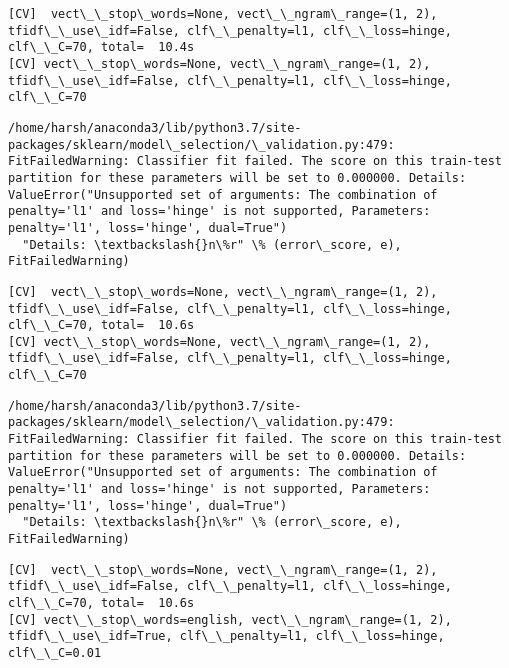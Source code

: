 \documentclass[11pt]{article}
\begin{document}
    \begin{Verbatim}[commandchars=\\\{\}]
[CV]  vect\_\_stop\_words=None, vect\_\_ngram\_range=(1, 2), tfidf\_\_use\_idf=False, clf\_\_penalty=l1, clf\_\_loss=hinge, clf\_\_C=70, total=  10.4s
[CV] vect\_\_stop\_words=None, vect\_\_ngram\_range=(1, 2), tfidf\_\_use\_idf=False, clf\_\_penalty=l1, clf\_\_loss=hinge, clf\_\_C=70 

    \end{Verbatim}

    \begin{Verbatim}[commandchars=\\\{\}]
/home/harsh/anaconda3/lib/python3.7/site-packages/sklearn/model\_selection/\_validation.py:479: FitFailedWarning: Classifier fit failed. The score on this train-test partition for these parameters will be set to 0.000000. Details: 
ValueError("Unsupported set of arguments: The combination of penalty='l1' and loss='hinge' is not supported, Parameters: penalty='l1', loss='hinge', dual=True")
  "Details: \textbackslash{}n\%r" \% (error\_score, e), FitFailedWarning)

    \end{Verbatim}

    \begin{Verbatim}[commandchars=\\\{\}]
[CV]  vect\_\_stop\_words=None, vect\_\_ngram\_range=(1, 2), tfidf\_\_use\_idf=False, clf\_\_penalty=l1, clf\_\_loss=hinge, clf\_\_C=70, total=  10.6s
[CV] vect\_\_stop\_words=None, vect\_\_ngram\_range=(1, 2), tfidf\_\_use\_idf=False, clf\_\_penalty=l1, clf\_\_loss=hinge, clf\_\_C=70 

    \end{Verbatim}

    \begin{Verbatim}[commandchars=\\\{\}]
/home/harsh/anaconda3/lib/python3.7/site-packages/sklearn/model\_selection/\_validation.py:479: FitFailedWarning: Classifier fit failed. The score on this train-test partition for these parameters will be set to 0.000000. Details: 
ValueError("Unsupported set of arguments: The combination of penalty='l1' and loss='hinge' is not supported, Parameters: penalty='l1', loss='hinge', dual=True")
  "Details: \textbackslash{}n\%r" \% (error\_score, e), FitFailedWarning)

    \end{Verbatim}

    \begin{Verbatim}[commandchars=\\\{\}]
[CV]  vect\_\_stop\_words=None, vect\_\_ngram\_range=(1, 2), tfidf\_\_use\_idf=False, clf\_\_penalty=l1, clf\_\_loss=hinge, clf\_\_C=70, total=  10.6s
[CV] vect\_\_stop\_words=english, vect\_\_ngram\_range=(1, 2), tfidf\_\_use\_idf=True, clf\_\_penalty=l1, clf\_\_loss=hinge, clf\_\_C=0.01 

    \end{Verbatim}
\end{document}
